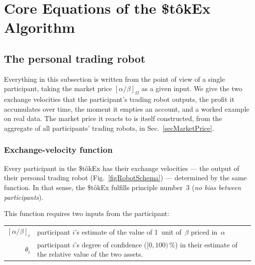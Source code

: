 \documentclass[letterpaper]{article}
\newcommand{\priceAB}{\left[\alpha / \beta\right]}
\newcommand{\StokEx}{\$t\^{o}kEx}
\begin{document}
\section{Core Equations of the \StokEx{} Algorithm}

\subsection{The personal trading robot} %

Everything in this subsection is written from the point of view of a single participant, taking the market price $\priceAB_\Omega$ as a given input.
We give the two exchange velocities that the participant's trading robot outputs, the profit it accumulates over time, the moment it empties an account, and a worked example on real data.
The market price it reacts to is itself constructed, from the aggregate of all participants' trading robots, in Sec.~\ref{secMarketPrice}.

\subsubsection{Exchange-velocity function}

Every participant in the \StokEx{} has their exchange velocities --- the output of their personal trading robot (Fig.~\ref{figRobotSchema}) --- determined by the same function.
In that sense, the \StokEx{} fulfills principle number~3 (\emph{no bias between participants}).

This function requires two inputs from the participant:

\begin{tabularx}{\textwidth}{rX}
 $[\alpha/\beta]_i$ & participant $i$'s estimate of the value of 1~unit of~$\beta$ priced in~$\alpha$ \\
$\theta_i$ & participant $i$'s degree of confidence ($[0,100)\,\%$) in their estimate of the relative value of the two assets.
\end{tabularx}
\end{document}
